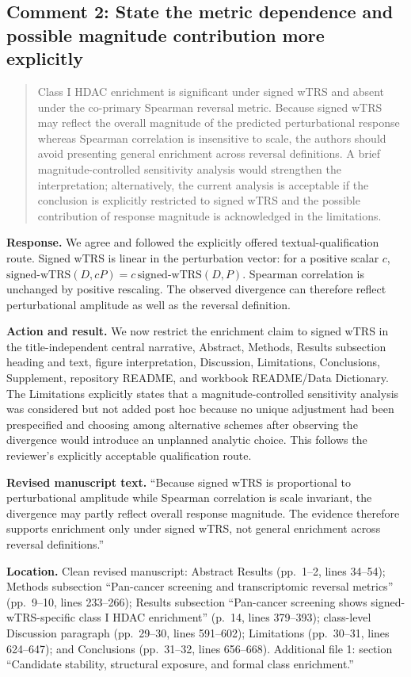 \documentclass[10pt]{article}
\newenvironment{reviewcomment}{%
  \begin{quote}\small\itshape\color{black}
}{\end{quote}}
\newcommand{\Response}{\textbf{Response.} }
\newcommand{\Action}{\textbf{Action and result.} }
\newcommand{\RevisedText}{\textbf{Revised manuscript text.} }
\newcommand{\Location}{\textbf{Location.} }
\newcommand{\qtext}[1]{``#1''}
\begin{document}
\subsection*{Comment 2: State the metric dependence and possible magnitude contribution more explicitly}

\begin{reviewcomment}
Class I HDAC enrichment is significant under signed wTRS and absent under the co-primary Spearman reversal metric. Because signed wTRS may reflect the overall magnitude of the predicted perturbational response whereas Spearman correlation is insensitive to scale, the authors should avoid presenting general enrichment across reversal definitions. A brief magnitude-controlled sensitivity analysis would strengthen the interpretation; alternatively, the current analysis is acceptable if the conclusion is explicitly restricted to signed wTRS and the possible contribution of response magnitude is acknowledged in the limitations.
\end{reviewcomment}

\Response We agree and followed the explicitly offered textual-qualification route. Signed wTRS is linear in the perturbation vector: for a positive scalar $c$, $\mathrm{signed\mbox{-}wTRS}(D,cP)=c\,\mathrm{signed\mbox{-}wTRS}(D,P)$. Spearman correlation is unchanged by positive rescaling. The observed divergence can therefore reflect perturbational amplitude as well as the reversal definition.

\Action We now restrict the enrichment claim to signed wTRS in the title-independent central narrative, Abstract, Methods, Results subsection heading and text, figure interpretation, Discussion, Limitations, Conclusions, Supplement, repository README, and workbook README/Data Dictionary. The Limitations explicitly states that a magnitude-controlled sensitivity analysis was considered but not added post hoc because no unique adjustment had been prespecified and choosing among alternative schemes after observing the divergence would introduce an unplanned analytic choice. This follows the reviewer's explicitly acceptable qualification route.

\RevisedText \qtext{Because signed wTRS is proportional to perturbational amplitude while Spearman correlation is scale invariant, the divergence may partly reflect overall response magnitude. The evidence therefore supports enrichment only under signed wTRS, not general enrichment across reversal definitions.}

\Location Clean revised manuscript: Abstract Results (pp.~1--2, lines 34--54); Methods subsection ``Pan-cancer screening and transcriptomic reversal metrics'' (pp.~9--10, lines 233--266); Results subsection ``Pan-cancer screening shows signed-wTRS-specific class I HDAC enrichment'' (p.~14, lines 379--393); class-level Discussion paragraph (pp.~29--30, lines 591--602); Limitations (pp.~30--31, lines 624--647); and Conclusions (pp.~31--32, lines 656--668). Additional file 1: section ``Candidate stability, structural exposure, and formal class enrichment.''
\end{document}
